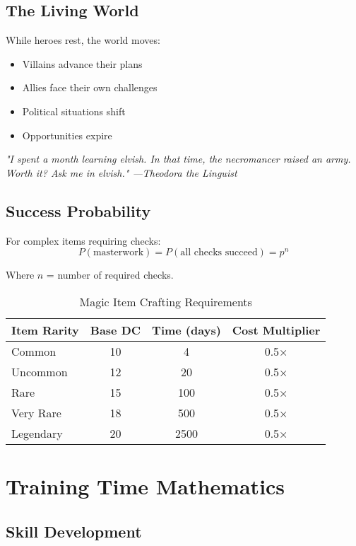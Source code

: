 \documentclass[11pt,letterpaper,openany]{book}
\newcommand{\fantasyquote}[1]{%
\begin{center}
\textit{\large #1}
\end{center}
}
\begin{document}
\subsection{The Living World}

While heroes rest, the world moves:
\begin{itemize}
    \item Villains advance their plans
    \item Allies face their own challenges
    \item Political situations shift
    \item Opportunities expire
\end{itemize}

\fantasyquote{"I spent a month learning elvish. In that time, the necromancer raised an army. Worth it? Ask me in elvish." —Theodora the Linguist}

\subsection{Success Probability}

For complex items requiring checks:
\begin{equation}
P(\text{masterwork}) = P(\text{all checks succeed}) = p^n
\end{equation}

Where $n$ = number of required checks.

\begin{table}[h]
\centering
\begin{tabular}{@{}lccc@{}}
\toprule
\textbf{Item Rarity} & \textbf{Base DC} & \textbf{Time (days)} & \textbf{Cost Multiplier} \\
\midrule
Common & 10 & 4 & 0.5× \\
Uncommon & 12 & 20 & 0.5× \\
Rare & 15 & 100 & 0.5× \\
Very Rare & 18 & 500 & 0.5× \\
Legendary & 20 & 2500 & 0.5× \\
\bottomrule
\end{tabular}
\caption{Magic Item Crafting Requirements}
\end{table}

\section{Training Time Mathematics}

\subsection{Skill Development}
\end{document}
